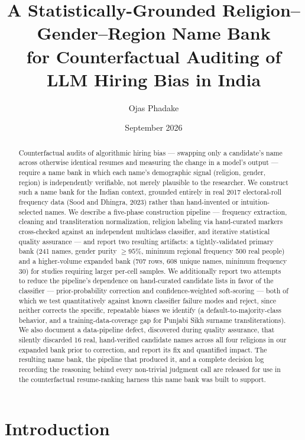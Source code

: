 \documentclass[11pt]{article}
\title{\textbf{A Statistically-Grounded Religion--Gender--Region Name Bank\\
for Counterfactual Auditing of LLM Hiring Bias in India}}
\author{Ojas Phadake}
\date{September 2026}
\begin{document}
\maketitle

\begin{abstract}
Counterfactual audits of algorithmic hiring bias --- swapping only a candidate's name across otherwise identical resumes and measuring the change in a model's output --- require a name bank in which each name's demographic signal (religion, gender, region) is independently verifiable, not merely plausible to the researcher. We construct such a name bank for the Indian context, grounded entirely in real 2017 electoral-roll frequency data (Sood and Dhingra, 2023) rather than hand-invented or intuition-selected names. We describe a five-phase construction pipeline --- frequency extraction, cleaning and transliteration normalization, religion labeling via hand-curated markers cross-checked against an independent multiclass classifier, and iterative statistical quality assurance --- and report two resulting artifacts: a tightly-validated primary bank (241 names, gender purity $\geq 95\%$, minimum regional frequency 500 real people) and a higher-volume expanded bank (707 rows, 608 unique names, minimum frequency 30) for studies requiring larger per-cell samples. We additionally report two attempts to reduce the pipeline's dependence on hand-curated candidate lists in favor of the classifier --- prior-probability correction and confidence-weighted soft-scoring --- both of which we test quantitatively against known classifier failure modes and reject, since neither corrects the specific, repeatable biases we identify (a default-to-majority-class behavior, and a training-data-coverage gap for Punjabi Sikh surname transliterations). We also document a data-pipeline defect, discovered during quality assurance, that silently discarded 16 real, hand-verified candidate names across all four religions in our expanded bank prior to correction, and report its fix and quantified impact. The resulting name bank, the pipeline that produced it, and a complete decision log recording the reasoning behind every non-trivial judgment call are released for use in the counterfactual resume-ranking harness this name bank was built to support.
\end{abstract}

\section{Introduction}
\end{document}
